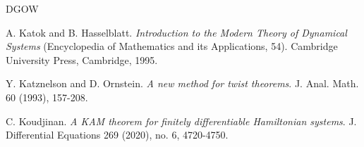 \documentclass{amsart}
\newcounter{item}[section]
\theoremstyle{definition}
\begin{document}
\begin{thebibliography}{DGOW}
			
			
			
			
			
			 A. Katok and B. Hasselblatt. {\it Introduction to the Modern Theory of Dynamical Systems} (Encyclopedia of Mathematics and its Applications, 54). Cambridge University Press, Cambridge, 1995.
			
			
			
			Y. Katznelson and D. Ornstein. {\it
				A new method for twist theorems}.
			J. Anal. Math. 60 (1993), 157-208.
			
			
			
			 C. Koudjinan. {\it A KAM theorem for finitely differentiable Hamiltonian systems}.
			J. Differential Equations 269 (2020), no. 6, 4720-4750.
			
			
			
			
			
			
			
			
			
			
			
			
			
			

\end{thebibliography}
\end{document}
